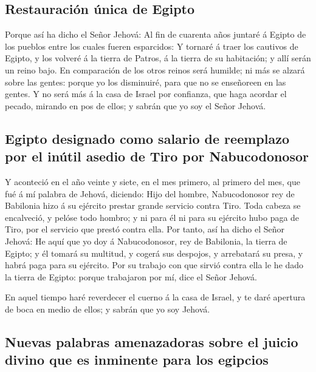 \hypertarget{restauraciuxf3n-uxfanica-de-egipto}{%
\subsection{Restauración única de
Egipto}\label{restauraciuxf3n-uxfanica-de-egipto}}

 Porque así ha dicho el Señor Jehová: Al fin de cuarenta
años juntaré á Egipto de los pueblos entre los cuales fueren esparcidos:
 Y tornaré á traer los cautivos de Egipto, y los volveré á
la tierra de Patros, á la tierra de su habitación; y allí serán un reino
bajo.  En comparación de los otros reinos será humilde; ni
más se alzará sobre las gentes: porque yo los disminuiré, para que no se
enseñoreen en las gentes.  Y no será más á la casa de
Israel por confianza, que haga acordar el pecado, mirando en pos de
ellos; y sabrán que yo soy el Señor Jehová.

\hypertarget{egipto-designado-como-salario-de-reemplazo-por-el-inuxfatil-asedio-de-tiro-por-nabucodonosor}{%
\subsection{Egipto designado como salario de reemplazo por el inútil
asedio de Tiro por
Nabucodonosor}\label{egipto-designado-como-salario-de-reemplazo-por-el-inuxfatil-asedio-de-tiro-por-nabucodonosor}}

 Y aconteció en el año veinte y siete, en el mes primero,
al primero del mes, que fué á mí palabra de Jehová, diciendo:
 Hijo del hombre, Nabucodonosor rey de Babilonia hizo á su
ejército prestar grande servicio contra Tiro. Toda cabeza se encalveció,
y pelóse todo hombro; y ni para él ni para su ejército hubo paga de
Tiro, por el servicio que prestó contra ella.  Por tanto,
así ha dicho el Señor Jehová: He aquí que yo doy á Nabucodonosor, rey de
Babilonia, la tierra de Egipto; y él tomará su multitud, y cogerá sus
despojos, y arrebatará su presa, y habrá paga para su ejército.
 Por su trabajo con que sirvió contra ella le he dado la
tierra de Egipto: porque trabajaron por mí, dice el Señor Jehová.

 En aquel tiempo haré reverdecer el cuerno á la casa de
Israel, y te daré apertura de boca en medio de ellos; y sabrán que yo
soy Jehová.

\hypertarget{nuevas-palabras-amenazadoras-sobre-el-juicio-divino-que-es-inminente-para-los-egipcios}{%
\subsection{Nuevas palabras amenazadoras sobre el juicio divino que es
inminente para los
egipcios}\label{nuevas-palabras-amenazadoras-sobre-el-juicio-divino-que-es-inminente-para-los-egipcios}}

